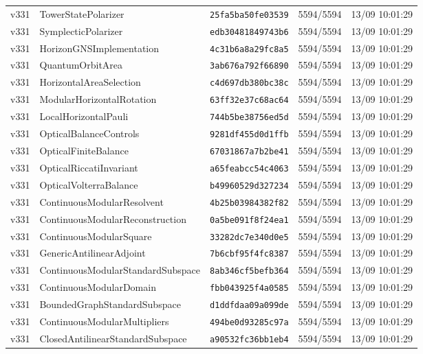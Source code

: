 \documentclass[11pt]{article}
\theoremstyle{definition}\newtheorem{deriv}{Derivation}
\begin{document}
{\begin{longtable}{@{}lllll@{}}
v331 & TowerStatePolarizer & \texttt{25fa5ba50fe03539} & 5594/5594 & 13/09 10:01:29 \\
v331 & SymplecticPolarizer & \texttt{edb30481849743b6} & 5594/5594 & 13/09 10:01:29 \\
v331 & HorizonGNSImplementation & \texttt{4c31b6a8a29fc8a5} & 5594/5594 & 13/09 10:01:29 \\
v331 & QuantumOrbitArea & \texttt{3ab676a792f66890} & 5594/5594 & 13/09 10:01:29 \\
v331 & HorizontalAreaSelection & \texttt{c4d697db380bc38c} & 5594/5594 & 13/09 10:01:29 \\
v331 & ModularHorizontalRotation & \texttt{63ff32e37c68ac64} & 5594/5594 & 13/09 10:01:29 \\
v331 & LocalHorizontalPauli & \texttt{744b5be38756ed5d} & 5594/5594 & 13/09 10:01:29 \\
v331 & OpticalBalanceControls & \texttt{9281df455d0d1ffb} & 5594/5594 & 13/09 10:01:29 \\
v331 & OpticalFiniteBalance & \texttt{67031867a7b2be41} & 5594/5594 & 13/09 10:01:29 \\
v331 & OpticalRiccatiInvariant & \texttt{a65feabcc54c4063} & 5594/5594 & 13/09 10:01:29 \\
v331 & OpticalVolterraBalance & \texttt{b49960529d327234} & 5594/5594 & 13/09 10:01:29 \\
v331 & ContinuousModularResolvent & \texttt{4b25b03984382f82} & 5594/5594 & 13/09 10:01:29 \\
v331 & ContinuousModularReconstruction & \texttt{0a5be091f8f24ea1} & 5594/5594 & 13/09 10:01:29 \\
v331 & ContinuousModularSquare & \texttt{33282dc7e340d0e5} & 5594/5594 & 13/09 10:01:29 \\
v331 & GenericAntilinearAdjoint & \texttt{7b6cbf95f4fc8387} & 5594/5594 & 13/09 10:01:29 \\
v331 & ContinuousModularStandardSubspace & \texttt{8ab346cf5befb364} & 5594/5594 & 13/09 10:01:29 \\
v331 & ContinuousModularDomain & \texttt{fbb043925f4a0585} & 5594/5594 & 13/09 10:01:29 \\
v331 & BoundedGraphStandardSubspace & \texttt{d1ddfdaa09a099de} & 5594/5594 & 13/09 10:01:29 \\
v331 & ContinuousModularMultipliers & \texttt{494be0d93285c97a} & 5594/5594 & 13/09 10:01:29 \\
v331 & ClosedAntilinearStandardSubspace & \texttt{a90532fc36bb1eb4} & 5594/5594 & 13/09 10:01:29 \\

\end{longtable}}
\end{document}
